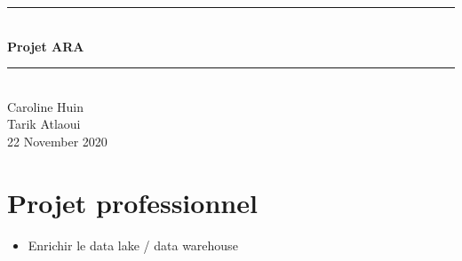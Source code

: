 \documentclass{article}
\author{Caroline Huin \\ Tarik Atlaoui }
\date{\today}
\begin{document}
\begin{titlepage}
	\enlargethispage{2cm}
	\newcommand{\HRule}{\rule{\linewidth}{0.5mm}}
	\center
	\HRule \\[0.4cm]
	{ \huge \bfseries Projet ARA\\[0.15cm] }
	\HRule \\[4cm]
	\large{Caroline Huin \\[3mm] Tarik Atlaoui} \\[3cm]
	22 November 2020 \\[3cm]
\end{titlepage}
	\newpage
	\section{Projet professionnel}

  
\begin{itemize}

\item Enrichir le data lake / data warehouse
\end{itemize}
\end{document}
